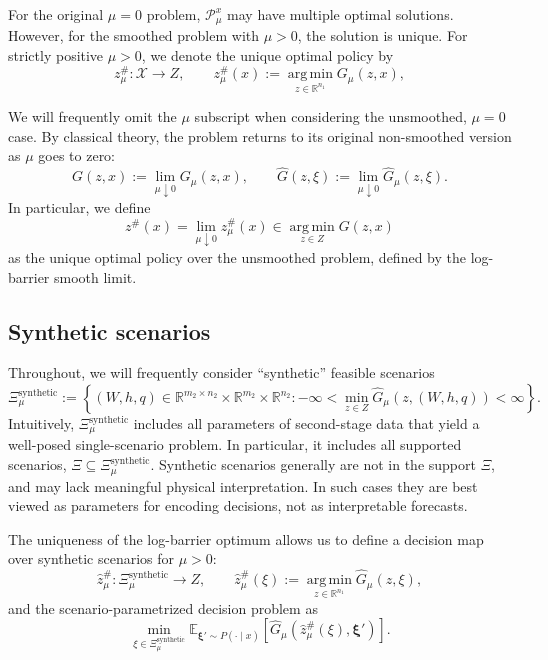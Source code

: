 \documentclass{article}
\newcommand{\R}{\mathbb{R}}
\newcommand{\E}{\mathbb{E}}
\newcommand{\1}{\mathbf{1}}
\newcommand{\argmin}{\operatorname*{arg\,min}}
\theoremstyle{plain}
\theoremstyle{definition}
\theoremstyle{remark}
\begin{document}
For the original $\mu = 0$ problem, $\mathcal{P}_\mu^{x}$ may have multiple optimal solutions. However, for the smoothed problem with $\mu > 0$, the solution is unique. For strictly positive $\mu > 0$, we denote the unique optimal policy by
\begin{equation}
\label{eq:zsharp-mu}
z_\mu^\#:\mathcal X\to Z,
\qquad
z_\mu^\#(x):=\argmin_{z\in\R^{n_1}}G_\mu(z,x),
\end{equation}

We will frequently omit the $\mu$ subscript when considering the unsmoothed, $\mu = 0$ case. By classical theory, the problem returns to its original non-smoothed version as $\mu$ goes to zero:
\begin{equation}
\label{eq:G-limit}
G(z,x):=\lim_{\mu\downarrow 0}G_\mu(z,x),
\qquad
\hat G(z,\xi):=\lim_{\mu\downarrow 0}\hat G_\mu(z,\xi).
\end{equation}
In particular, we define
\begin{equation}
\label{eq:zsharp-limit}
z^\#(x)=\lim_{\mu \downarrow 0} z_\mu^\#(x) \in \argmin_{z\in Z} G(z,x)
\end{equation}
as the unique optimal policy over the unsmoothed problem, defined by the log-barrier smooth limit.

\subsection{Synthetic scenarios}
\label{sec:synthetic-scenarios}

Throughout, we will frequently consider ``synthetic'' feasible scenarios
\begin{equation}
\label{eq:Xi-synthetic}
\Xi_\mu^{\mathrm{synthetic}}:=
\left\{
(W,h,q)\in
\R^{m_2\times n_2}\times\R^{m_2}\times\R^{n_2}:
-\infty<
\min_{z\in Z}\hat G_\mu(z,(W,h,q))
<\infty
\right\}.
\end{equation}
Intuitively, $\Xi_\mu^{\mathrm{synthetic}}$ includes all parameters of second-stage data that yield a well-posed single-scenario problem. In particular, it includes all supported scenarios, $\Xi\subseteq \Xi_\mu^{\mathrm{synthetic}}$. Synthetic scenarios generally are not in the support $\Xi$, and may lack meaningful physical interpretation. In such cases they are best viewed as parameters for encoding decisions, not as interpretable forecasts.

The uniqueness of the log-barrier optimum allows us to define a decision map over synthetic scenarios for $\mu>0$:
\begin{equation}
\label{eq:single-scenario-map-mu}
\hat z_\mu^\#:\Xi_\mu^{\mathrm{synthetic}}\to Z,
\qquad
\hat z_\mu^\#(\xi):=\argmin_{z\in\R^{n_1}}\hat G_\mu(z,\xi),
\end{equation}
and the scenario-parametrized decision problem as
\begin{equation}
\label{eq:scenario-parametrized-decision-problem}
\min_{\xi\in\Xi_\mu^{\mathrm{synthetic}}}
\E_{\boldsymbol{\xi}'\sim P(\cdot\mid x)}
\!\left[
\hat G_\mu\!\left(\hat z_\mu^\#(\xi),\boldsymbol{\xi}'\right)
\right].
\end{equation}
\end{document}
